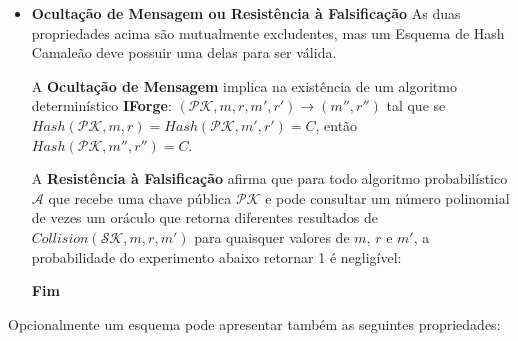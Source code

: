 \documentclass[a4paper]{article}
\begin{document}
\begin{itemize}
\item\textbf{Ocultação de Mensagem ou Resistência à Falsificação} As
  duas propriedades acima são mutualmente excludentes, mas um Esquema
  de Hash Camaleão deve possuir uma delas para ser válida.

  A \textbf{Ocultação de Mensagem} implica na existência de um
  algoritmo determinístico \textbf{IForge}: $(\mathcal{PK}, m, r, m',
  r') \rightarrow (m'', r'')$ tal que se $Hash(\mathcal{PK}, m, r) =
  Hash(\mathcal{PK}, m', r') = C$, então $Hash(\mathcal{PK}, m'',
  r'')=C$.

  A \textbf{Resistência à Falsificação} afirma que para todo algoritmo
  probabilístico $\mathcal{A}$ que recebe uma chave pública
  $\mathcal{PK}$ e pode consultar um número polinomial de vezes um
  oráculo que retorna diferentes resultados de
  $Collision(\mathcal{SK}, m, r, m')$ para quaisquer valores de $m$,
  $r$ e $m'$, a probabilidade do experimento abaixo retornar 1 é
  negligível:

  \noindent
  \begin{algorithm}[H]
    \SetAlgoLined
     \textbf{Fim}
  \end{algorithm}
\end{itemize}

Opcionalmente um esquema pode apresentar também as seguintes
propriedades:
\end{document}
